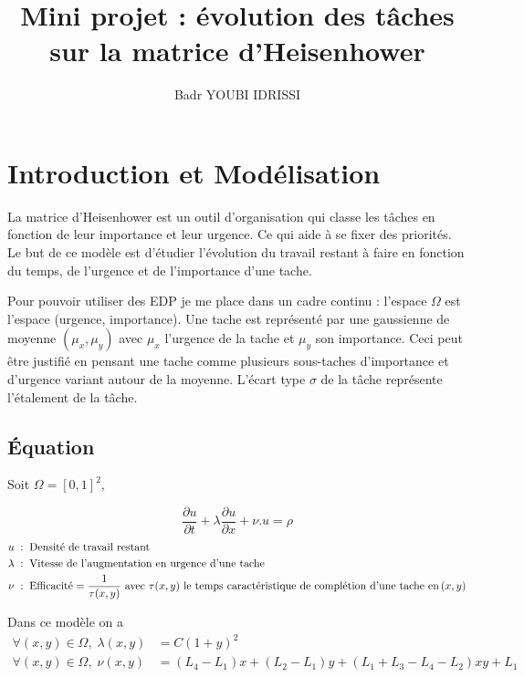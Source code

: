 \documentclass[french]{article}
\author{Badr YOUBI IDRISSI}
\title{Mini projet : évolution des tâches sur la matrice d'Heisenhower}
\begin{document}
\maketitle
\section{Introduction et Modélisation}

    La matrice d'Heisenhower est un outil d'organisation qui classe les tâches en fonction de leur 
    importance et leur urgence. Ce qui aide à se fixer des priorités. Le but de ce modèle est d'étudier
    l'évolution du travail restant à faire en fonction du temps, de l'urgence et de l'importance d'une tache.
    
    Pour pouvoir utiliser des EDP je me place dans un cadre continu : l'espace $\Omega$ est l'espace (urgence, importance). Une tache est représenté par 
    une gaussienne de moyenne $(\mu_x,\mu_y)$ avec $\mu_x$ l'urgence de la tache et $\mu_y$ son importance.
    Ceci peut être justifié en pensant une tache comme plusieurs sous-taches d'importance et d'urgence variant
    autour de la moyenne. L'écart type $\sigma$ de la tâche représente l'étalement de la tâche.

    \subsection{\'Equation}
    Soit $\Omega = [0,1]^2$,
    
    \begin{equation}\label{EDP}
        \frac{\partial u}{\partial t} + \lambda\frac{\partial u}{\partial x} + \nu.u = \rho 
    \end{equation}
    \begin{alignat*}{6}
        u \;:\; &\text{\;Densité de travail restant} \\
        \lambda \;:\; &\text{\;Vitesse de l'augmentation en urgence d'une tache}\\
        \nu \;:\; &\text{\;Efficacité} = \frac{1}{\tau(x,y)} \text{ avec } \tau(x,y) \text{ le temps caractéristique de complétion d'une tache en} \,(x,y)
    \end{alignat*}
    
    Dans ce modèle on a
    \begin{align}
        \forall(x,y)\in\Omega, \; \lambda(x,y) &= C(1+y)^2 \\
        \forall(x,y)\in\Omega, \; \nu(x,y) &= (L_4-L_1)x+(L_2-L_1)y+(L_1+L_3-L_4-L_2)xy+L_1
    \end{align}
    
\end{document}
